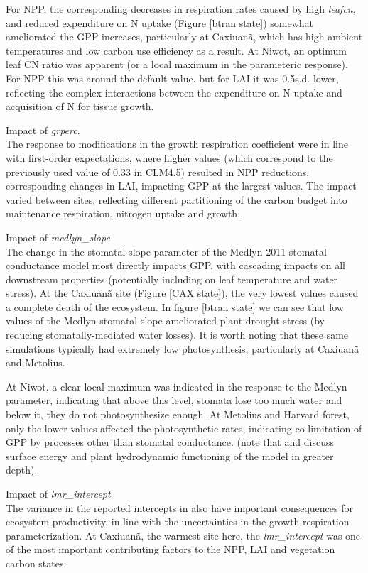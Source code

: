 \documentclass[draft,linenumbers]{agujournal}
\begin{document}
For NPP, the corresponding decreases in respiration rates caused by high \emph{leafcn}, and reduced expenditure on N uptake (Figure \ref{btran state}) somewhat ameliorated the GPP increases, particularly at Caxiuan\~a, which has high ambient temperatures and low carbon use efficiency as a result. At Niwot, an optimum leaf CN ratio was apparent (or a local maximum in the parameteric response). For NPP this was around the default value, but for LAI it was 0.5s.d. lower, reflecting the complex interactions between the expenditure on N uptake and acquisition of N for tissue growth. 

Impact of \emph{grperc}.\\
The response to modifications in the growth respiration coefficient were in line with first-order expectations, where higher values (which correspond to the previously used value of 0.33 in CLM4.5) resulted in NPP reductions, corresponding changes in LAI, impacting GPP at the largest values.   The impact varied between sites, reflecting different partitioning of the carbon budget into maintenance respiration, nitrogen uptake and growth. 

Impact of \emph{medlyn\_slope}\\
The change in the stomatal slope parameter of the Medlyn 2011 stomatal conductance model most directly impacts GPP, with cascading impacts on all downstream properties (potentially including on leaf temperature and water stress). At the Caxiuan\~a site (Figure \ref{CAX state}), the very lowest values caused a complete death of the ecosystem. In figure 
\ref{btran state} we can see that low values of the Medlyn stomatal slope ameliorated plant drought stress (by reducing stomatally-mediated water losses). It is worth noting that these same simulations typically had extremely low photosynthesis, particularly at Caxiuan\~a and Metolius. 

At Niwot, a clear local maximum was indicated in the response to the Medlyn parameter, indicating that above this level, stomata lose too much water and below it, they do not photosynthesize enough. At Metolius and Harvard forest, only the lower values affected the photosynthetic rates, indicating co-limitation of GPP by processes other than stomatal conductance. (note that \cite{kennedy} and \cite{dagon} discuss surface energy and plant hydrodynamic functioning of the model in greater depth). 

Impact of \emph{lmr\_intercept}\\
The variance in the reported intercepts in \cite{atkin2016} also have important consequences for ecosystem productivity, in line with the uncertainties in the growth respiration parameterization. At Caxiuan\~a, the warmest site here, the \emph{lmr\_intercept} was one of the most important contributing factors to the NPP, LAI and vegetation carbon states.  
\end{document}
